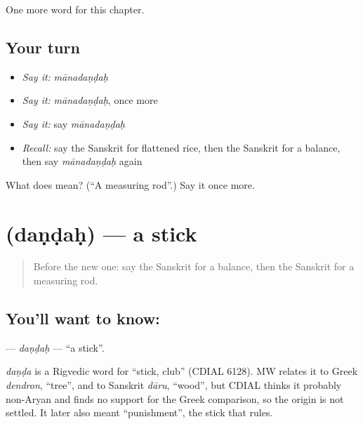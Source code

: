 \begin{grammarlens}[title={What you've built}]
One more word for this chapter.
\end{grammarlens}

\subsection*{Your turn}
\begin{itemize}
\raggedright
  \item \emph{Say it:} \emph{mānadaṇḍaḥ}
  \item \emph{Say it:} \emph{mānadaṇḍaḥ}, once more
  \item \emph{Say it:} say \emph{mānadaṇḍaḥ}
  \item \emph{Recall:} say the Sanskrit for flattened rice, then the Sanskrit for a balance, then say \emph{mānadaṇḍaḥ} again
\end{itemize}

\begin{tcolorbox}[breakable,colback=teal!4,colframe=teal!35!black,title={Before you move on}]
What does  mean? (\textquotedblleft{}A measuring rod\textquotedblright{}.) Say it once more.
\end{tcolorbox}
\section[\texorpdfstring{\sk{दण्डः} (daṇḍaḥ)}{दण्डः (daṇḍaḥ)}]{ (daṇḍaḥ) — a stick}

\label{lesson:SA-C220-dandah}



\begin{quote}
Before the new one: say the Sanskrit for a balance, then the Sanskrit for a measuring rod.
\end{quote}

\subsection*{You'll want to know: }
\textbf{} — \emph{daṇḍaḥ} — \textquotedblleft{}a stick\textquotedblright{}.

\begin{cousinweb}
\emph{daṇḍa} is a Rigvedic word for \textquotedblleft{}stick, club\textquotedblright{} (CDIAL 6128). MW relates it to Greek \emph{dendron}, \textquotedblleft{}tree\textquotedblright{}, and to Sanskrit \emph{dāru}, \textquotedblleft{}wood\textquotedblright{}, but CDIAL thinks it probably non-Aryan and finds no support for the Greek comparison, so the origin is not settled. It later also meant \textquotedblleft{}punishment\textquotedblright{}, the stick that rules.
\end{cousinweb}

